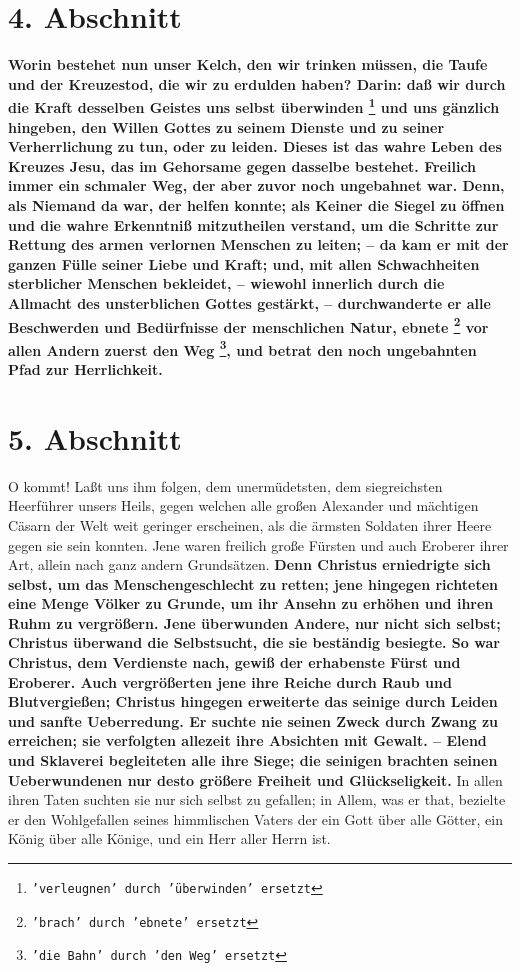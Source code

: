 \section{4. Abschnitt} \label{kap4_ab4}

 
\textbf{Worin bestehet nun unser Kelch, den wir trinken müssen, die Taufe und
der
Kreuzestod, die wir zu erdulden haben? Darin: daß wir durch die Kraft desselben
Geistes uns selbst überwinden \footnote{\texttt{'verleugnen' durch 'überwinden'
ersetzt}} und uns gänzlich hingeben, den Willen Gottes zu
seinem Dienste und zu seiner Verherrlichung zu tun, oder zu leiden. Dieses ist
das wahre Leben des Kreuzes Jesu, das im Gehorsame gegen dasselbe bestehet.
Freilich immer ein schmaler Weg, der aber zuvor noch ungebahnet war. Denn, als
Niemand da war, der helfen konnte; als Keiner die Siegel  zu
öffnen und die wahre
Erkenntniß mitzutheilen verstand, um die Schritte zur Rettung des armen
verlornen Menschen zu leiten; -- da kam er mit der ganzen Fülle seiner Liebe und
Kraft; und, mit allen Schwachheiten sterblicher Menschen bekleidet, -- wiewohl
innerlich durch die Allmacht  des unsterblichen Gottes
gestärkt, -- durchwanderte
er alle Beschwerden und Bedürfnisse der menschlichen Natur, ebnete
\footnote{\texttt{'brach' durch 'ebnete' ersetzt}} vor allen
Andern zuerst den Weg \footnote{\texttt{'die Bahn' durch 'den Weg' ersetzt}}, und
betrat den noch ungebahnten Pfad zur Herrlichkeit.}

\section{5. Abschnitt} \label{kap4_ab5}

O kommt! Laßt uns ihm folgen, dem unermüdetsten, dem siegreichsten Heerführer
unsers Heils, gegen welchen alle großen Alexander 
und mächtigen Cäsarn der Welt 
weit geringer erscheinen, als die ärmsten Soldaten ihrer Heere
 gegen sie sein
konnten. Jene waren freilich große Fürsten und auch Eroberer
 ihrer Art, allein
nach ganz andern Grundsätzen. \textbf{Denn Christus erniedrigte sich selbst, um
das
Menschengeschlecht zu retten; jene hingegen richteten eine Menge Völker zu
Grunde, um ihr Ansehn zu erhöhen und ihren Ruhm zu vergrößern. Jene überwunden
Andere, nur nicht sich selbst; Christus überwand die Selbstsucht, die sie
beständig besiegte. So war Christus, dem Verdienste nach, gewiß der erhabenste
Fürst und Eroberer. Auch vergrößerten jene ihre Reiche durch Raub und
Blutvergießen; Christus hingegen erweiterte das seinige durch Leiden und sanfte
Ueberredung. Er suchte nie seinen Zweck durch Zwang zu erreichen; sie verfolgten
allezeit ihre Absichten mit Gewalt. -- Elend und Sklaverei begleiteten alle ihre
Siege; die seinigen brachten seinen Ueberwundenen nur desto größere Freiheit und
Glückseligkeit.} In allen ihren Taten suchten sie nur sich selbst zu gefallen;
in Allem, was er that, bezielte er den Wohlgefallen seines himmlischen Vaters
der ein Gott über alle Götter, ein König über alle Könige, und ein Herr aller
Herrn ist.

